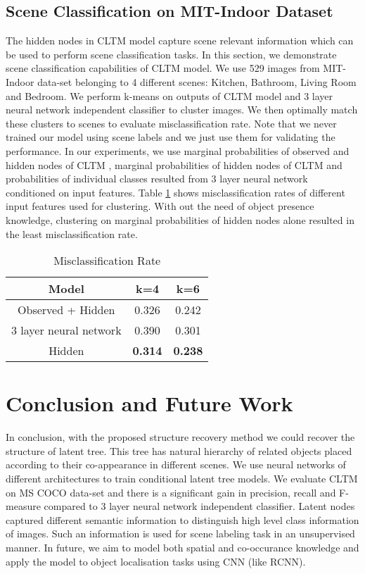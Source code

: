 \documentclass{article}
\begin{document}
\subsection{Scene Classification on MIT-Indoor Dataset}

The hidden nodes in CLTM model capture scene relevant information which can be used to perform scene classification tasks. In this section, we demonstrate scene classification capabilities of CLTM model. We use 529 images from MIT-Indoor data-set belonging to 4 different scenes: Kitchen, Bathroom, Living Room  and Bedroom. We perform k-means on outputs of CLTM model and 3 layer neural network independent classifier to cluster images. We then optimally match these clusters to scenes to evaluate misclassification rate. Note that we never trained our model using scene labels and we just use them for validating the performance. In our experiments, we use marginal  probabilities of observed and hidden nodes of CLTM , marginal probabilities of hidden nodes of CLTM  and probabilities of individual classes resulted from 3 layer neural network conditioned on input features. Table \ref{table:k-means} shows misclassification rates of different input features used for clustering.
With out the need of object presence knowledge, clustering on marginal probabilities of hidden nodes alone resulted in the least misclassification rate.


\begin{table}[ht]
\caption{Misclassification Rate}

\vspace{-0.15in}


\centering
\begin{tabular}{|c c c| }
\hline\hline
Model & k=4 & k=6  \\ [0.3ex]
\hline
Observed + Hidden & 0.326 & 0.242  \\
3 layer neural network & 0.390 & 0.301  \\
Hidden & \textbf{0.314} & \textbf{0.238}  \\
\hline
\end{tabular}
\label{table:k-means}
\end{table}



\section{Conclusion and Future Work} \label{sec:conclusion}
In conclusion, with the proposed structure recovery method we could recover the structure of latent tree. This tree has natural hierarchy of related objects placed according to their co-appearance in different scenes. We use neural networks of different architectures to train conditional latent tree models. We evaluate CLTM on MS COCO data-set and there is a significant gain in precision, recall and F-measure compared to 3 layer neural network independent classifier. Latent nodes captured different semantic information to distinguish high level class information  of images. Such an information is used for scene labeling task in an unsupervised manner.
In future, we aim to model both spatial and co-occurance knowledge and apply the model to object localisation tasks using CNN (like RCNN).
\end{document}
